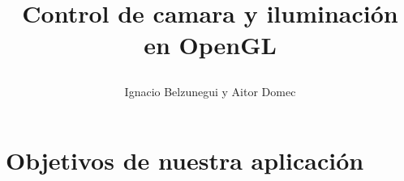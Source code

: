 \documentclass[12pt,a4paper]{article}
\begin{document}
\title{\begin{center}
\end{center}
\vspace{1cm}
Control de camara y iluminación en OpenGL}

\author{Ignacio Belzunegui y Aitor Domec}

\maketitle

\section{Objetivos de nuestra aplicación}
\end{document}
